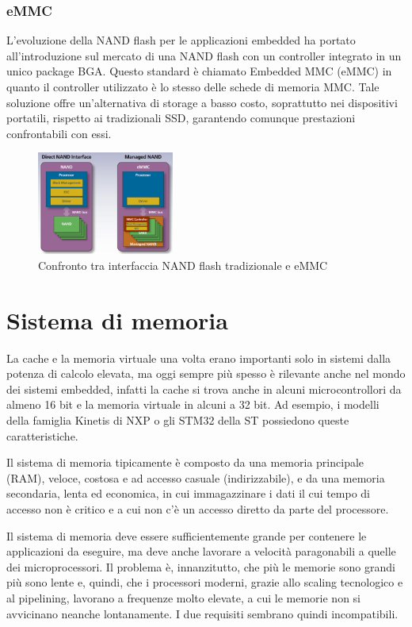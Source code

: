 \documentclass[11pt,4paper]{report}
\begin{document}
\subsection{eMMC}
L'evoluzione della NAND flash per le applicazioni embedded ha portato all'introduzione sul mercato di una NAND flash con un controller integrato in un unico package BGA. Questo standard è chiamato Embedded MMC (eMMC) in quanto il controller utilizzato è lo stesso delle schede di memoria MMC. Tale soluzione offre un'alternativa di storage a basso costo, soprattutto nei dispositivi portatili, rispetto ai tradizionali SSD, garantendo comunque prestazioni confrontabili con essi.
\begin{figure}[hbtp]
	\centering
	\includegraphics[width=0.4\textwidth]{memorie/jc_emmc}
	\caption{Confronto tra interfaccia NAND flash tradizionale e eMMC}
\end{figure}

\chapter{Sistema di memoria}
La cache e la memoria virtuale una volta erano importanti solo in sistemi dalla potenza di calcolo elevata, ma oggi sempre più spesso è rilevante anche nel mondo dei sistemi embedded, infatti la cache si trova anche in alcuni microcontrollori da almeno 16 bit e la memoria virtuale in alcuni a 32 bit. Ad esempio, i modelli della famiglia Kinetis di NXP o gli STM32 della ST possiedono queste caratteristiche.


Il sistema di memoria tipicamente è composto da una memoria principale (RAM), veloce, costosa e ad accesso casuale (indirizzabile), e da una memoria secondaria, lenta ed economica, in cui immagazzinare i dati il cui tempo di accesso non è critico e a cui non c'è un accesso diretto da parte del processore. 

Il sistema di memoria deve essere sufficientemente grande per contenere le applicazioni da eseguire, ma deve anche lavorare a velocità paragonabili a quelle dei microprocessori. Il problema è, innanzitutto, che più le memorie sono grandi più sono lente e, quindi, che i processori moderni, grazie allo scaling tecnologico e al pipelining, lavorano a frequenze molto elevate, a cui le memorie non si avvicinano neanche lontanamente. I due requisiti sembrano quindi incompatibili.
\end{document}
